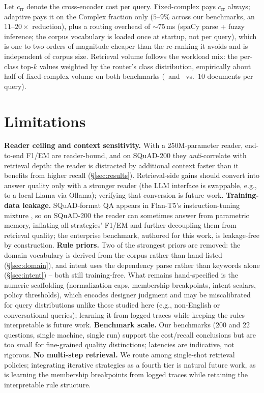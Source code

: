 \documentclass[11pt]{article}
\begin{document}
Let $c_{\mathrm{rr}}$ denote the cross-encoder cost per query. Fixed-complex
pays $c_{\mathrm{rr}}$ always; adaptive pays it on the Complex fraction only
($5$--$9\%$ across our benchmarks, an $11$--$20\times$ reduction), plus a
routing overhead of $\sim$75\,ms (spaCy parse + fuzzy inference; the
corpus vocabulary is loaded once at startup, not per query), which is one to two
orders of magnitude cheaper than the re-ranking it avoids and is independent of
corpus size. Retrieval volume follows the workload mix: the per-class top-$k$
values weighted by the router's class distribution, empirically about half of
fixed-complex volume on both benchmarks (\sqAdDocs\ and \enAdDocs\ vs.\ $10$
documents per query).

\section{Limitations}
\label{sec:limits}

\textbf{Reader ceiling and context sensitivity.} With a 250M-parameter
reader, end-to-end F1/EM are reader-bound, and on SQuAD-200 they
\emph{anti}-correlate with retrieval depth: the reader is distracted by
additional context faster than it benefits from higher recall
(\S\ref{sec:results}). Retrieval-side gains should convert into answer
quality only with a stronger reader (the LLM interface is swappable, e.g., to
a local Llama via Ollama); verifying that conversion is future work.
\textbf{Training-data leakage.} SQuAD-format QA appears in Flan-T5's
instruction-tuning mixture \citep{chung2024flan}, so on SQuAD-200 the reader
can sometimes answer from parametric memory, inflating all strategies' F1/EM
and further decoupling them from retrieval quality; the enterprise benchmark,
authored for this work, is leakage-free by construction. \textbf{Rule
priors.} Two of the strongest priors are removed: the domain vocabulary is
derived from the corpus rather than hand-listed (\S\ref{sec:domain}), and intent
uses the dependency parse rather than keywords alone (\S\ref{sec:intent}) --
both still training-free. What remains hand-specified is the numeric scaffolding
(normalization caps, membership breakpoints, intent scalars, policy thresholds),
which encodes designer judgment and may be miscalibrated for query distributions
unlike those studied here (e.g., non-English or conversational queries);
learning it from logged traces while keeping the rules interpretable is future
work. \textbf{Benchmark scale.} Our
benchmarks (200 and 22 questions, single machine, single run) support the
cost/recall conclusions but are too small for fine-grained quality
distinctions; latencies are indicative, not rigorous. \textbf{No
multi-step retrieval.} We route among single-shot retrieval policies;
integrating iterative strategies \citep{jiang2023flare,jeong2024adaptive} as a
fourth tier is natural future work, as is learning the membership breakpoints
from logged traces while retaining the interpretable rule structure.
\end{document}
